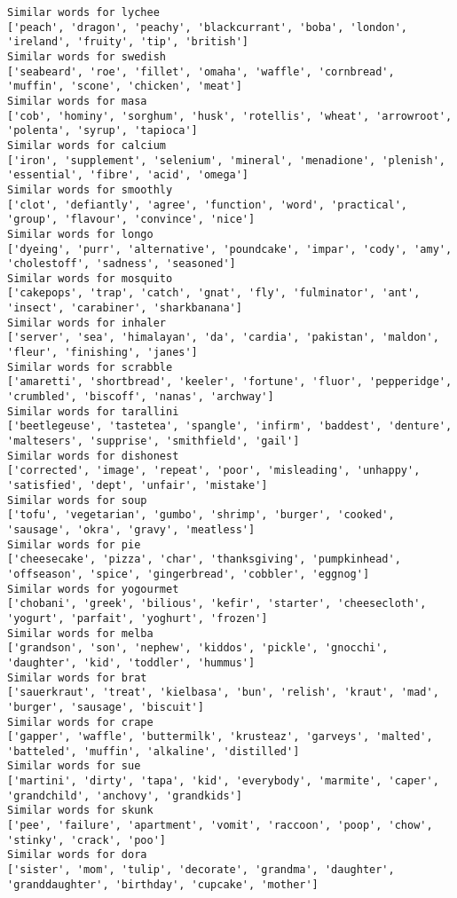 \documentclass[11pt]{article}
\begin{document}
\begin{Verbatim}[commandchars=\\\{\}]
Similar words for lychee
['peach', 'dragon', 'peachy', 'blackcurrant', 'boba', 'london', 'ireland', 'fruity', 'tip', 'british']
Similar words for swedish
['seabeard', 'roe', 'fillet', 'omaha', 'waffle', 'cornbread', 'muffin', 'scone', 'chicken', 'meat']
Similar words for masa
['cob', 'hominy', 'sorghum', 'husk', 'rotellis', 'wheat', 'arrowroot', 'polenta', 'syrup', 'tapioca']
Similar words for calcium
['iron', 'supplement', 'selenium', 'mineral', 'menadione', 'plenish', 'essential', 'fibre', 'acid', 'omega']
Similar words for smoothly
['clot', 'defiantly', 'agree', 'function', 'word', 'practical', 'group', 'flavour', 'convince', 'nice']
Similar words for longo
['dyeing', 'purr', 'alternative', 'poundcake', 'impar', 'cody', 'amy', 'cholestoff', 'sadness', 'seasoned']
Similar words for mosquito
['cakepops', 'trap', 'catch', 'gnat', 'fly', 'fulminator', 'ant', 'insect', 'carabiner', 'sharkbanana']
Similar words for inhaler
['server', 'sea', 'himalayan', 'da', 'cardia', 'pakistan', 'maldon', 'fleur', 'finishing', 'janes']
Similar words for scrabble
['amaretti', 'shortbread', 'keeler', 'fortune', 'fluor', 'pepperidge', 'crumbled', 'biscoff', 'nanas', 'archway']
Similar words for tarallini
['beetlegeuse', 'tastetea', 'spangle', 'infirm', 'baddest', 'denture', 'maltesers', 'supprise', 'smithfield', 'gail']
Similar words for dishonest
['corrected', 'image', 'repeat', 'poor', 'misleading', 'unhappy', 'satisfied', 'dept', 'unfair', 'mistake']
Similar words for soup
['tofu', 'vegetarian', 'gumbo', 'shrimp', 'burger', 'cooked', 'sausage', 'okra', 'gravy', 'meatless']
Similar words for pie
['cheesecake', 'pizza', 'char', 'thanksgiving', 'pumpkinhead', 'offseason', 'spice', 'gingerbread', 'cobbler', 'eggnog']
Similar words for yogourmet
['chobani', 'greek', 'bilious', 'kefir', 'starter', 'cheesecloth', 'yogurt', 'parfait', 'yoghurt', 'frozen']
Similar words for melba
['grandson', 'son', 'nephew', 'kiddos', 'pickle', 'gnocchi', 'daughter', 'kid', 'toddler', 'hummus']
Similar words for brat
['sauerkraut', 'treat', 'kielbasa', 'bun', 'relish', 'kraut', 'mad', 'burger', 'sausage', 'biscuit']
Similar words for crape
['gapper', 'waffle', 'buttermilk', 'krusteaz', 'garveys', 'malted', 'batteled', 'muffin', 'alkaline', 'distilled']
Similar words for sue
['martini', 'dirty', 'tapa', 'kid', 'everybody', 'marmite', 'caper', 'grandchild', 'anchovy', 'grandkids']
Similar words for skunk
['pee', 'failure', 'apartment', 'vomit', 'raccoon', 'poop', 'chow', 'stinky', 'crack', 'poo']
Similar words for dora
['sister', 'mom', 'tulip', 'decorate', 'grandma', 'daughter', 'granddaughter', 'birthday', 'cupcake', 'mother']

\end{Verbatim}
\end{document}

